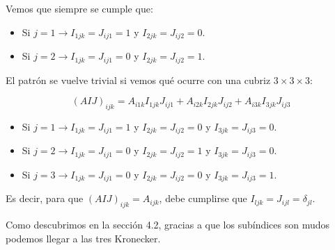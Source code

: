\documentclass[a4paper, titlepage]{article}
\begin{document}
Vemos que siempre se cumple que:

\begin{itemize}
	\item Si $j = 1 \rightarrow I_{1jk} = J_{ij1} = 1$ y $I_{2jk} = J_{ij2} = 0$.
	\item Si $j = 2 \rightarrow I_{1jk} = J_{ij1} = 0$ y $I_{2jk} = J_{ij2} = 1$.
\end{itemize}

El patrón se vuelve trivial si vemos qué ocurre con una cubriz $3 \times 3 \times 3$:

$$(AIJ)_{ijk} = A_{i1k} I_{1jk} J_{ij1} + A_{i2k} I_{2jk} J_{ij2} + A_{i3k} I_{3jk} J_{ij3}$$

\begin{itemize}
	\item Si $j = 1 \rightarrow I_{1jk} = J_{ij1} = 1$ y $I_{2jk} = J_{ij2} = 0$ y $I_{3jk} = J_{ij3} = 0$.
	\item Si $j = 2 \rightarrow I_{1jk} = J_{ij1} = 0$ y $I_{2jk} = J_{ij2} = 1$ y $I_{3jk} = J_{ij3} = 0$.
	\item Si $j = 3 \rightarrow I_{1jk} = J_{ij1} = 0$ y $I_{2jk} = J_{ij2} = 0$ y $I_{3jk} = J_{ij3} = 1$.
\end{itemize}

Es decir, para que $(AIJ)_{ijk} = A_{ijk}$, debe cumplirse que $I_{ljk} = J_{ijl} = \delta_{jl}$.

Como descubrimos en la sección 4.2, gracias a que los subíndices son mudos podemos llegar a las tres Kronecker.
\end{document}
